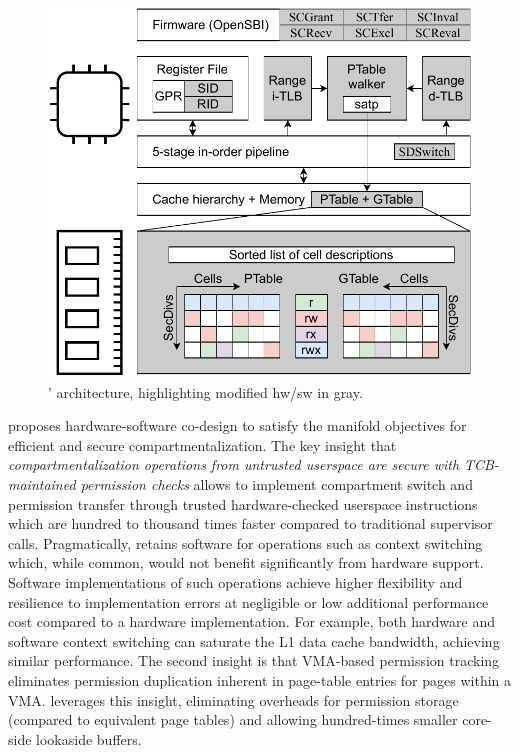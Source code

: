 \begin{figure}
  \centering
  \includegraphics[width=0.85\linewidth]{media/seccells/seccell_arch.pdf}
  \caption[\seccells: Architecture.]
          {\seccells' architecture, highlighting modified hw/sw in gray.}
  \label{fig:seccells:seccell_arch}
\end{figure}

\seccells proposes hardware-software co-design to satisfy the
manifold objectives for efficient and secure compartmentalization.
The key insight that \emph{compartmentalization operations from untrusted userspace
are secure with TCB-maintained permission checks} allows \seccells to
implement compartment switch and permission transfer through
trusted hardware-checked userspace instructions which are
hundred to thousand times faster compared to traditional supervisor calls.
Pragmatically, \seccells retains software for operations such as 
context switching which, while common, would not benefit significantly 
from hardware support.
Software implementations of such operations achieve higher flexibility and
resilience to implementation errors at negligible or low additional performance
cost compared to a hardware implementation.
For example, both hardware and software context switching can saturate
the L1 data cache bandwidth, achieving similar performance.
The second insight is that VMA-based permission tracking eliminates 
permission duplication inherent in page-table entries for pages 
within a VMA.
\seccells leverages this insight, eliminating overheads for 
permission storage (compared to equivalent page tables) and 
allowing hundred-times smaller core-side lookaside buffers. 

